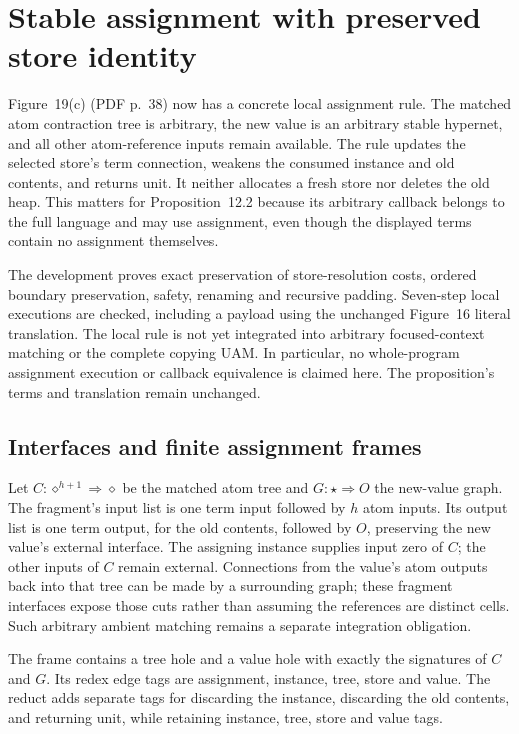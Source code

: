\clearpage
\section{Stable assignment with preserved store identity}
\label{sec:copying-assignment}
Figure~19(c) (PDF p.~38) now has a concrete local assignment rule.
The matched atom contraction tree is arbitrary, the new value is an arbitrary
stable hypernet, and all other atom-reference inputs remain available.
The rule updates the selected store's term connection, weakens the consumed
instance and old contents, and returns unit. It neither allocates a fresh
store nor deletes the old heap. This matters for Proposition~12.2 because
its arbitrary callback belongs to the full language and may use assignment,
even though the displayed terms contain no assignment themselves.

The development proves exact preservation of store-resolution costs, ordered
boundary preservation, safety, renaming and recursive padding. Seven-step
local executions are checked, including a payload using the unchanged
Figure~16 literal translation. The local rule is not yet integrated into
arbitrary focused-context matching or the complete copying UAM. In
particular, no whole-program assignment execution or callback equivalence
is claimed here. The proposition's terms and translation remain unchanged.

\subsection{Interfaces and finite assignment frames}

Let $C:\diamond^{h+1}\Rightarrow\diamond$ be the matched atom tree and
$G:\star\Rightarrow O$ the new-value graph. The fragment's input list is
one term input followed by $h$ atom inputs. Its output list is one term
output, for the old contents, followed by $O$, preserving the new value's
external interface. The assigning instance supplies input zero of $C$;
the other inputs of $C$ remain external. Connections from the value's atom
outputs back into that tree can be made by a surrounding graph; these
fragment interfaces expose those cuts rather than assuming the references
are distinct cells. Such arbitrary ambient matching remains a separate
integration obligation.

The frame contains a tree hole and a value hole with exactly the signatures
of $C$ and $G$. Its redex edge tags are assignment, instance, tree, store and
value. The reduct adds separate tags for discarding the instance, discarding
the old contents, and returning unit, while retaining instance, tree, store
and value tags.

